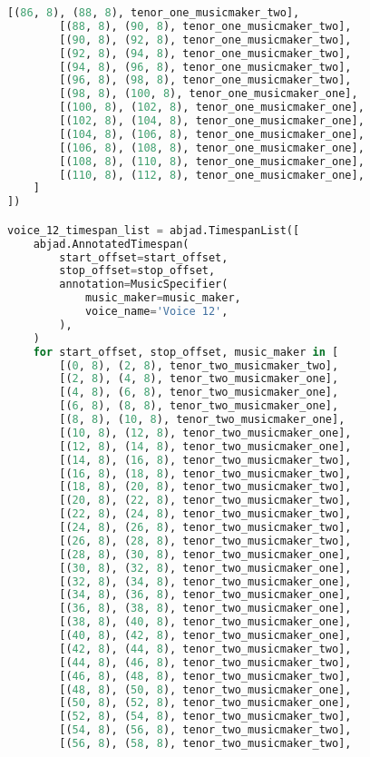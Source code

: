 \begin{lstlisting}[language=Python, caption=Invocation Source Code]
        [(86, 8), (88, 8), tenor_one_musicmaker_two],
        [(88, 8), (90, 8), tenor_one_musicmaker_two],
        [(90, 8), (92, 8), tenor_one_musicmaker_two],
        [(92, 8), (94, 8), tenor_one_musicmaker_two],
        [(94, 8), (96, 8), tenor_one_musicmaker_two],
        [(96, 8), (98, 8), tenor_one_musicmaker_two],
        [(98, 8), (100, 8), tenor_one_musicmaker_one],
        [(100, 8), (102, 8), tenor_one_musicmaker_one],
        [(102, 8), (104, 8), tenor_one_musicmaker_one],
        [(104, 8), (106, 8), tenor_one_musicmaker_one],
        [(106, 8), (108, 8), tenor_one_musicmaker_one],
        [(108, 8), (110, 8), tenor_one_musicmaker_one],
        [(110, 8), (112, 8), tenor_one_musicmaker_one],
    ]
])

voice_12_timespan_list = abjad.TimespanList([
    abjad.AnnotatedTimespan(
        start_offset=start_offset,
        stop_offset=stop_offset,
        annotation=MusicSpecifier(
            music_maker=music_maker,
            voice_name='Voice 12',
        ),
    )
    for start_offset, stop_offset, music_maker in [
        [(0, 8), (2, 8), tenor_two_musicmaker_two],
        [(2, 8), (4, 8), tenor_two_musicmaker_one],
        [(4, 8), (6, 8), tenor_two_musicmaker_one],
        [(6, 8), (8, 8), tenor_two_musicmaker_one],
        [(8, 8), (10, 8), tenor_two_musicmaker_one],
        [(10, 8), (12, 8), tenor_two_musicmaker_one],
        [(12, 8), (14, 8), tenor_two_musicmaker_one],
        [(14, 8), (16, 8), tenor_two_musicmaker_two],
        [(16, 8), (18, 8), tenor_two_musicmaker_two],
        [(18, 8), (20, 8), tenor_two_musicmaker_two],
        [(20, 8), (22, 8), tenor_two_musicmaker_two],
        [(22, 8), (24, 8), tenor_two_musicmaker_two],
        [(24, 8), (26, 8), tenor_two_musicmaker_two],
        [(26, 8), (28, 8), tenor_two_musicmaker_two],
        [(28, 8), (30, 8), tenor_two_musicmaker_one],
        [(30, 8), (32, 8), tenor_two_musicmaker_one],
        [(32, 8), (34, 8), tenor_two_musicmaker_one],
        [(34, 8), (36, 8), tenor_two_musicmaker_one],
        [(36, 8), (38, 8), tenor_two_musicmaker_one],
        [(38, 8), (40, 8), tenor_two_musicmaker_one],
        [(40, 8), (42, 8), tenor_two_musicmaker_one],
        [(42, 8), (44, 8), tenor_two_musicmaker_two],
        [(44, 8), (46, 8), tenor_two_musicmaker_two],
        [(46, 8), (48, 8), tenor_two_musicmaker_two],
        [(48, 8), (50, 8), tenor_two_musicmaker_one],
        [(50, 8), (52, 8), tenor_two_musicmaker_one],
        [(52, 8), (54, 8), tenor_two_musicmaker_two],
        [(54, 8), (56, 8), tenor_two_musicmaker_two],
        [(56, 8), (58, 8), tenor_two_musicmaker_two],

\end{lstlisting}
